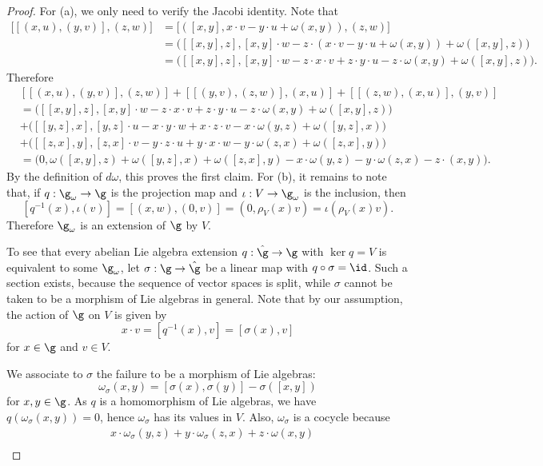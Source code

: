 \begin{proof}
For (a), we only need to verify the Jacobi identity. Note that
\begin{align*}
\big[[(x,u),(y,v)],(z,w)\big]&=\big[([x,y],x\cdot v-y\cdot u+\omega(x,y)),(z,w)\big]\\
&=\big([[x,y],z],[x,y]\cdot w-z\cdot(x\cdot v-y\cdot u+\omega(x,y))+\omega([x,y],z)\big)\\
&=\big([[x,y],z],[x,y]\cdot w-z\cdot x\cdot v+z\cdot y\cdot u-z\cdot\omega(x,y)+\omega([x,y],z)\big).
\end{align*}
Therefore
\begin{align*}
&[[(x,u),(y,v)],(z,w)]+[[(y,v),(z,w)],(x,u)]+[[(z,w),(x,u)],(y,v)]\\
&=\big([[x,y],z],[x,y]\cdot w-z\cdot x\cdot v+z\cdot y\cdot u-z\cdot\omega(x,y)+\omega([x,y],z)\big)\\
&+\big([[y,z],x],[y,z]\cdot u-x\cdot y\cdot w+x\cdot z\cdot v-x\cdot\omega(y,z)+\omega([y,z],x)\big)\\
&+\big([[z,x],y],[z,x]\cdot v-y\cdot z\cdot u+y\cdot x\cdot w-y\cdot\omega(z,x)+\omega([z,x],y)\big)\\
&=\big(0,\omega([x,y],z)+\omega([y,z],x)+\omega([z,x],y)-x\cdot\omega(y,z)-y\cdot\omega(z,x)-z\cdot(x,y)\big).
\end{align*}
By the definition of $d\omega$, this proves the first claim. For (b), it remains to note that, if $q:\g_\omega\to \g$ is the projection map and $\iota:V\to\g_\omega$ is the inclusion, then
\[[q^{-1}(x),\iota(v)]=[(x,w),(0,v)]=(0,\rho_V(x)v)=\iota(\rho_V(x)v).\]
Therefore $\g_\omega$ is an extension of $\g$ by $V$.\par
To see that every abelian Lie algebra extension $q:\hat{\g}\to\g$
with $\ker q=V$ is equivalent to some $\g_\omega$, let $\sigma:\g\to\hat{\g}$ be a linear map with $q\circ\sigma=\id$. Such a section exists, because the sequence of vector spaces is split, while $\sigma$ cannot be taken to be a morphism of Lie algebras in general. Note that by our assumption, the action of $\g$ on $V$ is given by
\[x\cdot v=[q^{-1}(x),v]=[\sigma(x),v]\]
for $x\in\g$ and $v\in V$.\par
We associate to $\sigma$ the failure to be a morphism of Lie algebras:
\[\omega_\sigma(x,y)=[\sigma(x),\sigma(y)]-\sigma([x,y])\]
for $x,y\in\g$. As $q$ is a homomorphism of Lie algebras, we have $q(\omega_\sigma(x,y))=0$, hence $\omega_\sigma$ has its values in $V$. 
Also, $\omega_\sigma$ is a cocycle because
\begin{align*}
&x\cdot\omega_\sigma(y,z)+y\cdot\omega_\sigma(z,x)+z\cdot\omega(x,y)\\

\end{align*}
\end{proof}
